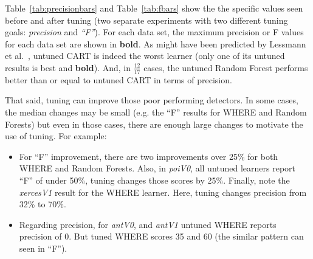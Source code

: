 \documentclass[smallextended]{svjour3}
\newcommand{\bi}{\begin{itemize}[leftmargin=0.4cm]}
\newcommand{\ei}{\end{itemize}}
\newcommand{\fig}[1]{Figure~\ref{fig:#1}}
\newcommand{\tab}[1]{Table~\ref{tab:#1}}
\begin{document}
 
\tab{precisionbars} and \tab{fbars} show the
the specific values seen before and after tuning (two separate experiments with two different tuning goals: {\em precision} and {\em ``F''}). 
For each data set, the maximum precision or F values for each data set are shown in {\bf bold}.
As might have been
 predicted by Lessmann et al.~\cite{lessmann2008benchmarking}, 
untuned CART is indeed the worst learner (only one of its
untuned results is best and {\bf bold}). 
And, 
in $\frac{12}{17}$ cases, the  untuned Random Forest performs better than or equal to untuned CART in terms of precision.  




That said,  tuning can improve those poor performing detectors.
In some cases, the median changes may be small (e.g. the ``F'' results for WHERE and Random Forests) but even in
those cases, there are enough large changes to motivate the use of tuning. For example:
\bi
\item
For ``F'' improvement, there are two improvements over 25\% for both WHERE and Random Forests. Also, in {\em poiV0}, all untuned learners report ``F'' of under 50\%, tuning changes those scores by 25\%. Finally, note the  {\em xercesV1} result for the WHERE learner. Here, tuning changes precision from 32\% to 70\%.
\item
Regarding precision, for {\em antV0}, and {\em antV1} untuned WHERE reports precision of 0. But tuned WHERE scores 35 and 60 (the similar pattern can seen in ``F'').

\ei

\end{document}
